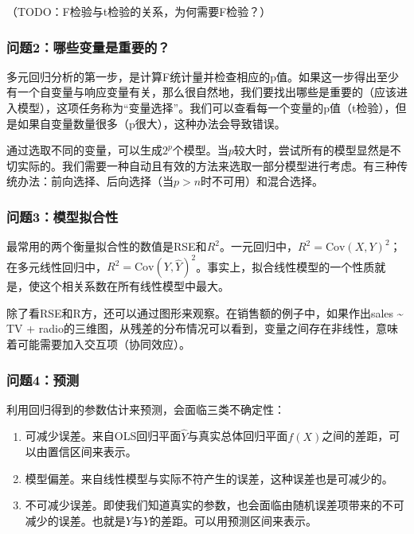 \documentclass[hyperref,]{ctexart}
\providecommand{\tightlist}{%
  \setlength{\itemsep}{0pt}\setlength{\parskip}{0pt}}
\begin{document}
（TODO：F检验与t检验的关系，为何需要F检验？）

\subsubsection{问题2：哪些变量是重要的？}\label{2}

多元回归分析的第一步，是计算F统计量并检查相应的p值。如果这一步得出至少有一个自变量与响应变量有关，那么很自然地，我们要找出哪些是重要的（应该进入模型），这项任务称为``变量选择''。我们可以查看每一个变量的p值（t检验），但是如果自变量数量很多（p很大），这种办法会导致错误。

通过选取不同的变量，可以生成\(2^p\)个模型。当\(p\)较大时，尝试所有的模型显然是不切实际的。我们需要一种自动且有效的方法来选取一部分模型进行考虑。有三种传统办法：前向选择、后向选择（当\(p>n\)时不可用）和混合选择。

\subsubsection{问题3：模型拟合性}\label{3}

最常用的两个衡量拟合性的数值是RSE和\(R^2\)。一元回归中，\(R^2=\mathrm{Cov}(X,Y)^2\)；在多元线性回归中，\(R^2=\mathrm{Cov}(Y,\hat{Y})^2\)。事实上，拟合线性模型的一个性质就是，使这个相关系数在所有线性模型中最大。

除了看RSE和R方，还可以通过图形来观察。在销售额的例子中，如果作出sales
\textasciitilde{} TV +
radio的三维图，从残差的分布情况可以看到，变量之间存在非线性，意味着可能需要加入交互项（协同效应）。

\subsubsection{问题4：预测}\label{4}

利用回归得到的参数估计来预测，会面临三类不确定性：

\begin{enumerate}
\def\labelenumi{\arabic{enumi}.}
\tightlist
\item
  可减少误差。来自OLS回归平面\(\hat{Y}\)与真实总体回归平面\(f(X)\)之间的差距，可以由置信区间来表示。
\item
  模型偏差。来自线性模型与实际不符产生的误差，这种误差也是可减少的。
\item
  不可减少误差。即使我们知道真实的参数，也会面临由随机误差项带来的不可减少的误差。也就是\(Y\)与\(\hat{Y}\)的差距。可以用预测区间来表示。
\end{enumerate}
\end{document}
